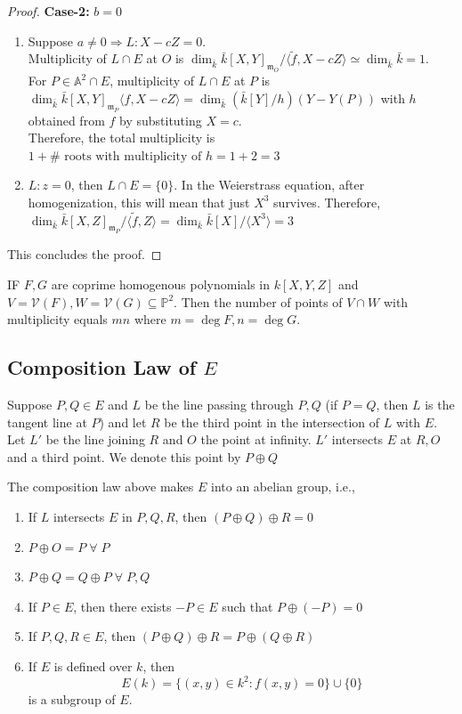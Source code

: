 \documentclass[oneside, 12pt]{scrbook}
\newcommand{\V}{\mathcal{V}}
\newcommand{\Aa}{\mathbb{A}}
\newcommand{\PP}{\mathbb{P}}
\newcommand{\m}{\mathfrak{m}}
\theoremstyle{theorem}
\begin{document}
\begin{proof}
\textbf{Case-2:} $b=0$
\begin{enumerate}
\item Suppose $a \neq 0 \Rightarrow L: X-cZ=0$. \\
Multiplicity of $L \cap E$ at $O$ is $\dim_{\bar{k}}\bar{k}[X,Y]_{\m_{O}}/ \langle \tilde{f} , X-cZ \rangle \simeq \dim_{\bar{k}} \bar{k} = 1$. \\
For $P \in \Aa^2 \cap E$, multiplicity of $L\cap E$ at $P$ is $\dim_{\bar{k}}\bar{k}[X,Y]_{\m_{P}} \langle f, X-cZ \rangle  = \dim_{\bar{k}}(\bar{k}[Y]/h)(Y-Y(P))$ with $h$ obtained from $f$ by substituting $X=c$. \\
Therefore, the total multiplicity is $1 + \#\text{ roots with multiplicity of } h = 1+2 =3$
\item $L : z=0$, then $L \cap E = \{0\}$. In the Weierstrass equation, after homogenization, this will mean that just $X^3$ survives. Therefore, $\dim_{\bar{k}} \bar{k}[X,Z]_{\m_{P}}/ \langle \tilde{f} , Z \rangle = \dim_{\bar{k}} \bar{k}[X]/\langle X^3 \rangle = 3$
\end{enumerate}
This concludes the proof.
\end{proof}

\begin{theorem}
IF $F,G$ are coprime homogenous polynomials in $k[X,Y,Z]$ and $V=\V(F), W=\V(G) \subseteq \PP^2$. Then the number of points of $V\cap W$ with multiplicity equals $mn$ where $m=\deg F, n = \deg G$.
\end{theorem}

\subsection{Composition Law of $E$}
Suppose $P,Q \in E$ and $L$ be the line passing through $P,Q$ (if $P=Q$, then $L$ is the tangent line at $P$) and let $R$ be the third point in the intersection of $L$ with $E$. Let $L'$ be the line joining $R$ and $O$ the point at infinity. $L'$ intersects $E$ at $R,O$ and a third point. We denote this point by $P \oplus Q$

\begin{proposition}
The composition law above makes $E$ into an abelian group, i.e., 
\begin{enumerate}
\item If $L$ intersects $E$ in $P,Q,R$, then $(P \oplus Q) \oplus R = 0$
\item $P \oplus O = P \; \forall \; P$
\item $P \oplus Q = Q \oplus P \; \forall \; P,Q$
\item If $P \in E$, then there exists $-P \in E$ such that $P \oplus (-P) = 0$
\item If $P,Q,R \in E$, then $(P \oplus Q ) \oplus R = P \oplus (Q \oplus R)$
\item If $E$ is defined over $k$, then $$E(k) = \{(x,y) \in k^2 : f(x,y)=0\} \cup \{0\}$$ is a subgroup of $E$.
\end{enumerate}
\end{proposition} 
\end{document}
